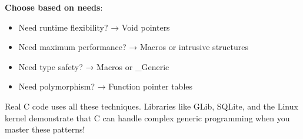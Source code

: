 \textbf{Choose based on needs}:
\begin{itemize}
    \item Need runtime flexibility? → Void pointers
    \item Need maximum performance? → Macros or intrusive structures
    \item Need type safety? → Macros or \_Generic
    \item Need polymorphism? → Function pointer tables
\end{itemize}

Real C code uses all these techniques. Libraries like GLib, SQLite, and the Linux kernel demonstrate that C can handle complex generic programming when you master these patterns!
